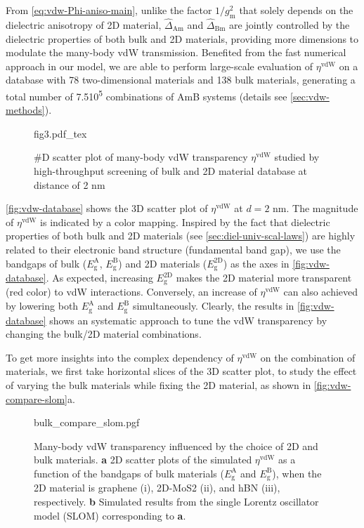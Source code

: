 From \autoref{eq:vdw-Phi-aniso-main}, unlike the factor
\(1/g_{\mathrm{m}}^{2}\) that solely depends on the dielectric
anisotropy of 2D material, \(\hat{\Delta}_{\mathrm{Am}}\) and
\(\hat{\Delta}_{\mathrm{Bm}}\) are jointly controlled by the
dielectric properties of both bulk and 2D materials, providing more
dimensions to modulate the many-body vdW transmission.
%
Benefited from
the fast numerical approach in our model, we are able to perform
large-scale evaluation of $\eta^{\mathrm{vdW}}$ on a database with
78 two-dimensional materials and 138 bulk materials, generating a total number of
7.5\texttimes{}10\textsuperscript{5} combinations of AmB systems
(details see \autoref{sec:vdw-methods}).
%
\begin{figure}[!htbp]
  \centering{}
  {fig3.pdf_tex}
  \caption{\label{fig:vdw-database} %
    #D scatter plot of many-body vdW transparency
    $\eta^{\mathrm{vdW}}$ studied by high-throughput screening of bulk
    and 2D material database at distance of 2 nm}
\end{figure}

\autoref{fig:vdw-database} shows the 3D scatter plot of
\(\eta^{\mathrm{vdW}}\) at \(d=2\) nm. The magnitude of
$\eta^{\mathrm{vdW}}$ is indicated by a color mapping.
%
Inspired by the fact that dielectric properties of both bulk
\cite{Moss_1950} and 2D materials (see
\autoref{sec:diel-univ-scal-laws}) are highly related to their
electronic band structure (\ie fundamental band gap), we use the
bandgaps of bulk (\(E_{\mathrm{g}}^{\mathrm{A}}\),
\(E_{\mathrm{g}}^{\mathrm{B}}\)) and 2D materials
(\(E_{\mathrm{g}}^{\mathrm{2D}}\)) as the axes in
\autoref{fig:vdw-database}.
%
As expected, increasing \(E_{\mathrm{g}}^{\mathrm{2D}}\) makes the 2D
material more transparent (red color) to vdW interactions.
%
Conversely, an increase of \(\eta^{\mathrm{vdW}}\) can also achieved
by lowering both \(E_{\mathrm{g}}^{\mathrm{A}}\) and
\(E_{\mathrm{g}}^{\mathrm{B}}\) simultaneously.
%
Clearly, the results in \autoref{fig:vdw-database} shows an systematic
approach to tune the vdW transparency by changing the bulk/2D material
combinations.


To get more insights into the complex dependency of
\(\eta^{\mathrm{vdW}}\) on the combination of materials, we first take
horizontal slices of the 3D scatter plot, to study the effect of
varying the bulk materials while fixing the 2D material, as shown in
\autoref{fig:vdw-compare-slom}a.
%
\begin{figure}[h!]
  \centering{}
  {bulk_compare_slom.pgf}
  \caption{\label{fig:vdw-compare-slom}%
    Many-body vdW transparency influenced by the choice of 2D and bulk
    materials. \textbf{a} 2D scatter plots of the simulated
    $\eta^{\mathrm{vdW}}$ as a function of the bandgaps of bulk
    materials ($E_{\mathrm{g}}^{\mathrm{A}}$ and
    $E_{\mathrm{g}}^{\mathrm{B}}$), when the 2D material is graphene
    (i), 2D-MoS2 (ii), and hBN (iii), respectively.  \textbf{b}
    Simulated results from the single Lorentz oscillator model (SLOM)
    corresponding to \textbf{a}.}
\end{figure}
%

